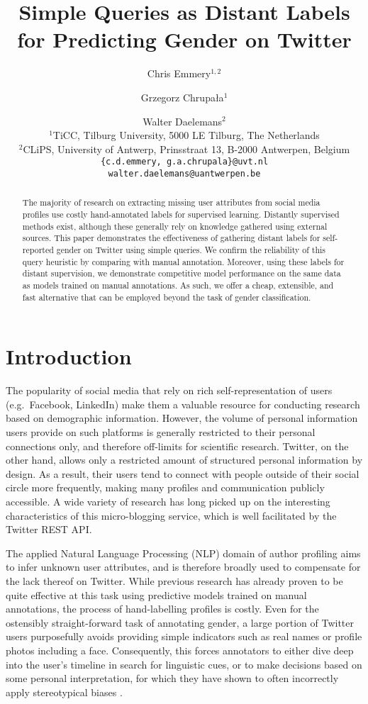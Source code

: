 \documentclass[11pt,letterpaper]{article}
\title{Simple Queries as Distant Labels for Predicting Gender on Twitter}
\author{Chris Emmery$^{1,2}$ \and Grzegorz Chrupa\l{}a$^{1}$ \and Walter Daelemans$^{2}$ \\
        $^{1}$TiCC, Tilburg University, 5000 LE Tilburg, The Netherlands \\
        $^{2}$CLiPS, University of Antwerp, Prinsstraat 13, B-2000 Antwerpen, Belgium \\
        {\tt \{c.d.emmery, g.a.chrupala\}@uvt.nl} \\
        {\tt walter.daelemans@uantwerpen.be} \\
        }
\date{}
\begin{document}
\maketitle

\begin{abstract}
	The majority of research on extracting missing user attributes from
	social media profiles use costly hand-annotated labels for
	supervised learning. Distantly supervised methods exist, although these
	generally rely on knowledge gathered using external sources. This paper
	demonstrates the effectiveness of gathering distant labels for self-reported
  gender on Twitter using simple queries. We confirm the reliability of this
  query heuristic by comparing with manual annotation. Moreover, using these
  labels for distant supervision, we demonstrate
	competitive model performance on the same data as models trained on manual
	annotations. As such, we offer a cheap, extensible, and fast alternative that
	can be employed beyond the task of gender classification.
\end{abstract}


\section{Introduction}

The popularity of social media that rely on rich self-representation of users
(e.g.\ Facebook, LinkedIn) make them a valuable resource for conducting
research based on demographic information. However, the volume of personal
information users provide on such platforms is generally restricted to their
personal connections only, and therefore off-limits for scientific research.
Twitter, on the other hand, allows only a restricted amount of structured
personal information by design. As a result, their users tend to connect with
people outside of their social circle more frequently, making many profiles and
communication publicly accessible. A wide variety of research has long picked
up on the interesting characteristics of this micro-blogging service, which is
well facilitated by the Twitter REST API.

The applied Natural Language Processing (NLP) domain of author profiling aims
to infer unknown user attributes, and is therefore broadly used to compensate for the
lack thereof on Twitter. While previous research has already proven to be quite
effective at this task using predictive models trained on manual annotations,
the process of hand-labelling profiles is costly. Even for the ostensibly
straight-forward task of annotating gender, a large portion of Twitter users
purposefully avoids providing simple indicators such as real names or profile
photos including a face.
Consequently, this forces annotators to either dive deep into the user's
timeline in search for linguistic cues, or to make decisions based on some
personal interpretation, for which they have shown to often incorrectly apply
stereotypical biases \cite{nguyen2014gender,flekova2016analyzing}.
\end{document}
